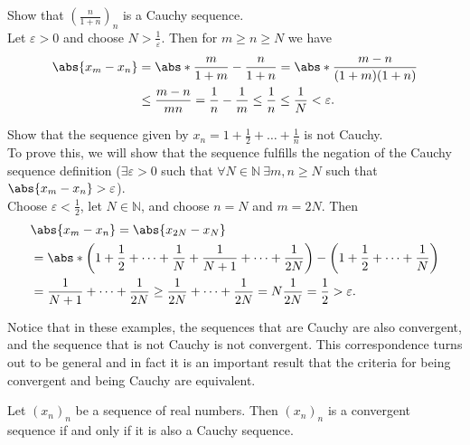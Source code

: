 \documentclass[../real_analysis.tex]{subfiles}
\begin{document}
        \begin{example}
            Show that $\left(\frac{n}{1+n}\right)_n$ is a Cauchy sequence.\\
            Let $\varepsilon>0$ and choose $N>\frac{1}{\varepsilon}$. Then for $m\geq n\geq N$ we have
            \begin{align}
                \abs{x_m-x_n}&=\abs*{\frac{m}{1+m}-\frac{n}{1+n}}=\abs*{\frac{m-n}{(1+m)(1+n)}}\\
                &\leq\frac{m-n}{mn}=\frac{1}{n}-\frac{1}{m}\leq\frac{1}{n}\leq\frac{1}{N}<\varepsilon.
            \end{align}
        \end{example}
        \begin{example}
            Show that the sequence given by $x_n=1+\frac{1}{2}+\dots+\frac{1}{n}$ is not Cauchy.\\
            To prove this, we will show that the sequence fulfills the negation of the Cauchy sequence definition ($\exists\varepsilon>0$ such that $\forall N\in\mathbb{N}\ \exists m,n\geq N$ such that $\abs{x_m-x_n}>\varepsilon$).\\
            Choose $\varepsilon<\frac{1}{2}$, let $N\in\mathbb{N}$, and choose $n=N$ and $m=2N$. Then
            \begin{align}
                &\abs{x_m-x_n}=\abs{x_{2N}-x_N}\\
                &=\abs*{\left(1+\frac{1}{2}+\dots+\frac{1}{N}+\frac{1}{N+1}+\dots+\frac{1}{2N}\right)-\left(1+\frac{1}{2}+\dots+\frac{1}{N}\right)}\\
                &=\frac{1}{N+1}+\dots+\frac{1}{2N}\geq\frac{1}{2N}+\dots+\frac{1}{2N}=N\frac{1}{2N}=\frac{1}{2}>\varepsilon.
            \end{align}
        \end{example}
        Notice that in these examples, the sequences that are Cauchy are also convergent, and the sequence that is not Cauchy is not convergent. This correspondence turns out to be general and in fact it is an important result that the criteria for being convergent and being Cauchy are equivalent.
        \begin{theorem}
            Let $(x_n)_n$ be a sequence of real numbers. Then $(x_n)_n$ is a convergent sequence if and only if it is also a Cauchy sequence.
        \end{theorem}
\end{document}
